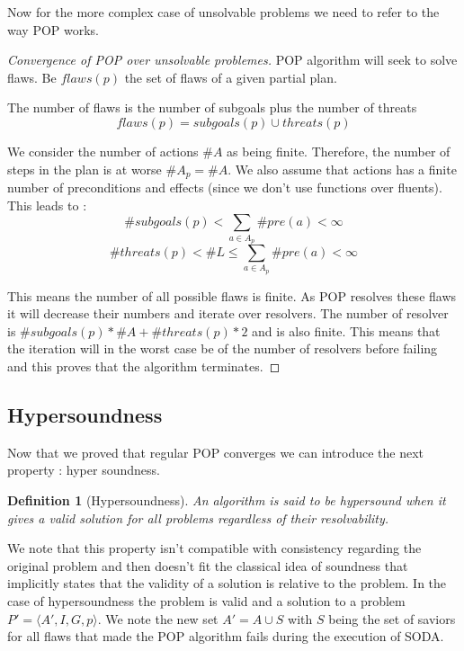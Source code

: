 \documentclass[]{article}
\newtheorem{definition}{Definition}
\begin{document}
Now for the more complex case of unsolvable problems we need to refer to
the way POP works.

\begin{proof}[Convergence of POP over unsolvable problemes]

POP algorithm will seek to solve flaws. Be \(flaws(p)\) the set of flaws
of a given partial plan.

The number of flaws is the number of subgoals plus the number of threats
\[flaws(p) = subgoals(p) \cup threats(p)\]

We consider the number of actions \(\#A\) as being finite. Therefore,
the number of steps in the plan is at worse \(\#A_p = \#A\). We also
assume that actions has a finite number of preconditions and effects
(since we don't use functions over fluents). This leads to :
\[\#subgoals(p) < \sum_{a \in A_p} \#pre(a) < \infty\]
\[\#threats(p) < \#L \le \sum_{a \in A_p} \#pre(a) < \infty\]

This means the number of all possible flaws is finite. As POP resolves
these flaws it will decrease their numbers and iterate over resolvers.
The number of resolver is \(\#subgoals(p) * \#A + \#threats(p) * 2\) and
is also finite. This means that the iteration will in the worst case be
of the number of resolvers before failing and this proves that the
algorithm terminates.

\end{proof}

\subsection{Hypersoundness}\label{hypersoundeness}

Now that we proved that regular POP converges we can introduce the next
property : hyper soundness.

\begin{definition}[Hypersoundness]

An algorithm is said to be hypersound when it gives a valid solution for
all problems regardless of their resolvability.

\end{definition}

We note that this property isn't compatible with consistency regarding
the original problem and then doesn't fit the classical idea of
soundness that implicitly states that the validity of a solution is
relative to the problem. In the case of hypersoundness the problem is
valid and a solution to a problem \(P' = \langle A', I, G, p\rangle\).
We note the new set \(A' = A \cup S\) with \(S\) being the set of
saviors for all flaws that made the POP algorithm fails during the
execution of SODA.
\end{document}
